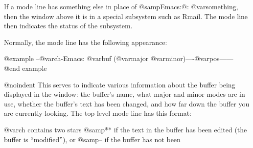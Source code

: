   If a mode line has something else in place of @samp{Emacs:@: @var{something}},
then the window above it is in a special subsystem such as Rmail.  The mode
line then indicates the status of the subsystem.

  Normally, the mode line has the following appearance:

@example
--@var{ch}-Emacs: @var{buf}      (@var{major} @var{minor})----@var{pos}------
@end example

@noindent
This serves to indicate various information about the buffer being
displayed in the window: the buffer's name, what major and minor modes are
in use, whether the buffer's text has been changed, and how far down the
buffer you are currently looking.  The top level mode line has this format:

  @var{ch} contains two stars @samp{**} if the text in the buffer has been
edited (the buffer is ``modified''), or @samp{--} if the buffer has not been
